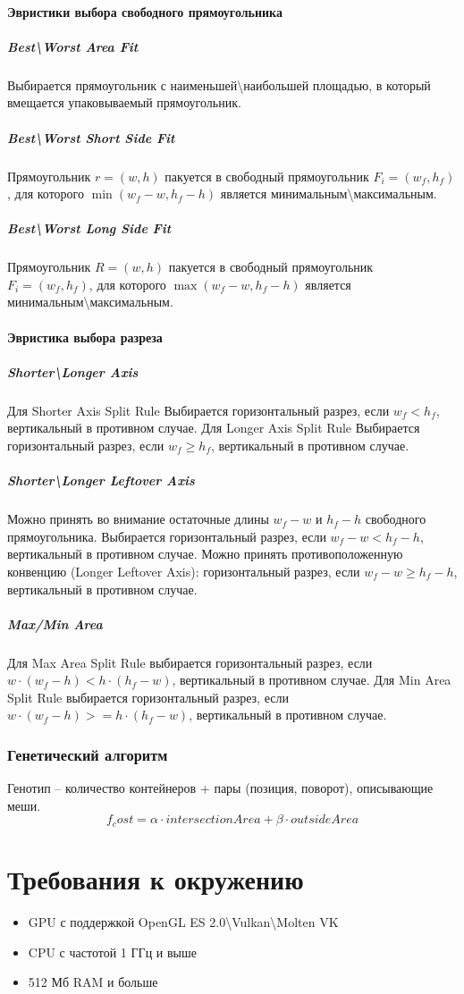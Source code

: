 \documentclass{fefu}
\begin{document}
\paragraph{Эвристики выбора свободного прямоугольника}
\subparagraph{Best\textbackslash Worst Area Fit}
Выбирается прямоугольник с наименьшей\textbackslash наибольшей площадью, в который вмещается упаковываемый прямоугольник.
\subparagraph{Best\textbackslash Worst Short Side Fit}
Прямоугольник $r = (w, h)$ пакуется в свободный прямоугольник $F_i = (w_f, h_f)$, для которого $\min (w_f - w, h_f - h)$
является минимальным\textbackslash максимальным.
\subparagraph{Best\textbackslash Worst Long Side Fit}
Прямоугольник $R = (w, h)$ пакуется в свободный прямоугольник $F_i = (w_f, h_f)$, для которого $\max (w_f - w, h_f - h)$
является минимальным\textbackslash максимальным.
\paragraph{Эвристика выбора разреза}
\subparagraph{Shorter\textbackslash Longer Axis}
Для Shorter Axis Split Rule Выбирается горизонтальный разрез, если $w_f < h_f$, вертикальный в противном случае.
Для Longer Axis Split Rule Выбирается горизонтальный разрез, если $w_f \geq h_f$, вертикальный в противном случае.
\subparagraph{Shorter\textbackslash Longer Leftover Axis}
Можно принять во внимание остаточные длины $w_f - w$ и $h_f - h$ свободного прямоугольника.
Выбирается горизонтальный разрез, если $w_f - w < h_f - h$, вертикальный в противном случае.
Можно принять противоположенную конвенцию (Longer Leftover Axis): горизонтальный разрез, если $w_f - w \geq h_f - h$,
вертикальный в противном случае.
\subparagraph{Max/Min Area}
Для Max Area Split Rule выбирается горизонтальный разрез, если $w \cdot (w_f - h) < h \cdot (h_f - w)$, вертикальный в
противном случае. Для Min Area Split Rule выбирается горизонтальный разрез, если $w \cdot (w_f - h) >= h \cdot (h_f - w)$, вертикальный в
противном случае.
\subsubsection{Генетический алгоритм}
Генотип -- количество контейнеров + пары (позиция, поворот), описывающие меши.
    \[
        f_cost = \alpha \cdot intersectionArea  + \beta \cdot outsideArea
    \]
\section{Требования к окружению}
\begin{itemize}
    \item GPU с поддержкой OpenGL ES 2.0\textbackslash Vulkan\textbackslash Molten VK
    \item CPU с частотой 1 ГГц и выше
    \item 512 Мб RAM и больше
\end{itemize}
\end{document}
